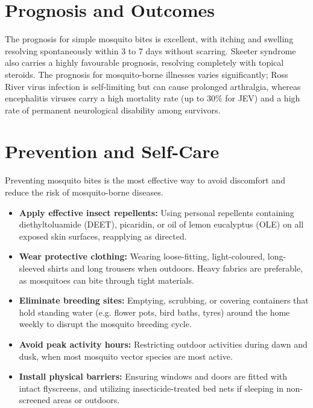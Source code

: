 \section*{Prognosis and Outcomes}
The prognosis for simple mosquito bites is excellent, with itching and swelling resolving spontaneously within 3 to 7 days without scarring. Skeeter syndrome also carries a highly favourable prognosis, resolving completely with topical steroids. The prognosis for mosquito-borne illnesses varies significantly; Ross River virus infection is self-limiting but can cause prolonged arthralgia, whereas encephalitis viruses carry a high mortality rate (up to 30\% for JEV) and a high rate of permanent neurological disability among survivors.

\section*{Prevention and Self-Care}
Preventing mosquito bites is the most effective way to avoid discomfort and reduce the risk of mosquito-borne diseases.
\begin{itemize}
    \item \textbf{Apply effective insect repellents:} Using personal repellents containing diethyltoluamide (DEET), picaridin, or oil of lemon eucalyptus (OLE) on all exposed skin surfaces, reapplying as directed.
    \item \textbf{Wear protective clothing:} Wearing loose-fitting, light-coloured, long-sleeved shirts and long trousers when outdoors. Heavy fabrics are preferable, as mosquitoes can bite through tight materials.
    \item \textbf{Eliminate breeding sites:} Emptying, scrubbing, or covering containers that hold standing water (e.g. flower pots, bird baths, tyres) around the home weekly to disrupt the mosquito breeding cycle.
    \item \textbf{Avoid peak activity hours:} Restricting outdoor activities during dawn and dusk, when most mosquito vector species are most active.
    \item \textbf{Install physical barriers:} Ensuring windows and doors are fitted with intact flyscreens, and utilizing insecticide-treated bed nets if sleeping in non-screened areas or outdoors.
\end{itemize}

